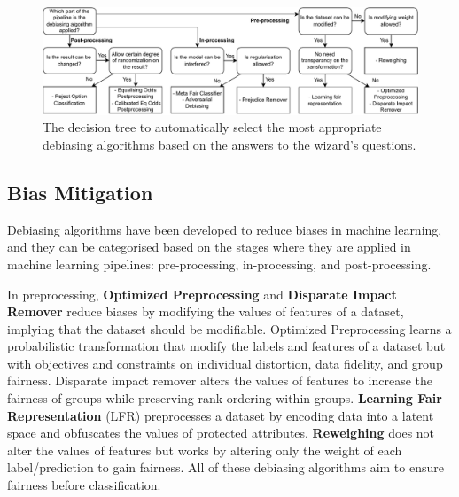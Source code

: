 \documentclass[sigconf,review]{acmart}
\begin{document}
\begin{figure}
	\includegraphics[width=\linewidth]{figures/wizard-debiasing}
	\caption{The decision tree to automatically select the most appropriate debiasing algorithms based on the answers to the wizard's questions.}
	\label{fig:wizard-debiasing}
\end{figure}

\subsection{Bias Mitigation}
\label{sec:bias_mitigation}

Debiasing algorithms have been developed to reduce biases in machine learning, and they can be categorised based on the stages where they are applied in machine learning pipelines: pre-processing, in-processing, and post-processing. 

In preprocessing, \textbf{Optimized Preprocessing} \cite{calmon2017optimized} and \textbf{Disparate Impact Remover} \cite{feldman2015disparate} reduce biases by modifying the values of features of a dataset, implying that the dataset should be modifiable. 
Optimized Preprocessing learns a probabilistic transformation that modify the labels and features of a dataset but with objectives and constraints on individual distortion, data fidelity, and group fairness.
Disparate impact remover alters the values of features to increase the fairness of groups while preserving rank-ordering within groups.
\textbf{Learning Fair Representation} (LFR) \cite{zemel2013lfr} preprocesses a dataset by encoding data into a latent space and obfuscates the values of protected attributes.
\textbf{Reweighing} \cite{kamiran2011reweighing} does not alter the values of features but works by altering only the weight of each label/prediction to gain fairness. All of these debiasing algorithms aim to ensure fairness before classification.
\end{document}
